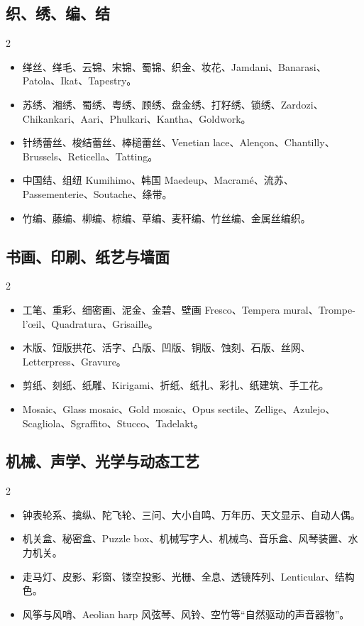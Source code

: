 \documentclass[lang=en,a4paper,11pt]{elegantpaper}
\begin{document}
\subsection{织、绣、编、结}


\begin{multicols}{2}
\begin{itemize}
\item 缂丝、缂毛、云锦、宋锦、蜀锦、织金、妆花、Jamdani、Banarasi、Patola、Ikat、Tapestry。
\item 苏绣、湘绣、蜀绣、粤绣、顾绣、盘金绣、打籽绣、锁绣、Zardozi、Chikankari、Aari、Phulkari、Kantha、Goldwork。
\item 针绣蕾丝、梭结蕾丝、棒槌蕾丝、Venetian lace、Alençon、Chantilly、Brussels、Reticella、Tatting。
\item 中国结、组纽 Kumihimo、韩国 Maedeup、Macramé、流苏、Passementerie、Soutache、绦带。
\item 竹编、藤编、柳编、棕编、草编、麦秆编、竹丝编、金属丝编织。
\end{itemize}
\end{multicols}

\subsection{书画、印刷、纸艺与墙面}


\begin{multicols}{2}
\begin{itemize}
\item 工笔、重彩、细密画、泥金、金碧、壁画 Fresco、Tempera mural、Trompe-l'œil、Quadratura、Grisaille。
\item 木版、饾版拱花、活字、凸版、凹版、铜版、蚀刻、石版、丝网、Letterpress、Gravure。
\item 剪纸、刻纸、纸雕、Kirigami、折纸、纸扎、彩扎、纸建筑、手工花。
\item Mosaic、Glass mosaic、Gold mosaic、Opus sectile、Zellige、Azulejo、Scagliola、Sgraffito、Stucco、Tadelakt。
\end{itemize}
\end{multicols}

\subsection{机械、声学、光学与动态工艺}


\begin{multicols}{2}
\begin{itemize}
\item 钟表轮系、擒纵、陀飞轮、三问、大小自鸣、万年历、天文显示、自动人偶。
\item 机关盒、秘密盒、Puzzle box、机械写字人、机械鸟、音乐盒、风琴装置、水力机关。
\item 走马灯、皮影、彩窗、镂空投影、光栅、全息、透镜阵列、Lenticular、结构色。
\item 风筝与风哨、Aeolian harp 风弦琴、风铃、空竹等“自然驱动的声音器物”。
\end{itemize}
\end{multicols}
\end{document}
